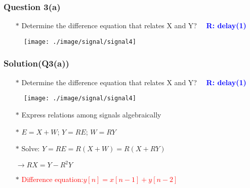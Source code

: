 \documentclass{beamer}
\newcommand{\blue}[1]{\textcolor{blue}{#1}}
\newcommand{\red}[1]{\textcolor{red}{#1}}
\begin{document}

\begin{frame}
\frametitle{Question 3(a)}

\begin{itemize} \itemsep1pt \parskip0pt 
  \item[$\ast$] Determine the difference equation that relates X and Y?  ~~\blue{\bf R: delay(1)}
\end{itemize}
\vspace{20 mm}


\begin{figure}[H]
  \centering
  \texttt{[image: ./image/signal/signal4]}
\end{figure}
\vspace{10 mm}

\end{frame}


\begin{frame}
\frametitle{Solution(Q3(a))}

\begin{itemize} \itemsep1pt \parskip0pt 
  \item[$\ast$] Determine the difference equation that relates X and Y?  ~~\blue{\bf R: delay(1)}
\end{itemize}


\begin{figure}[H]
  \centering
  \texttt{[image: ./image/signal/signal4]}
\end{figure}


\begin{itemize} \itemsep1pt \parskip0pt 
  \item[$\ast$] Express relations among signals algebraically
  \item[$\ast$] $E = X + W$; $Y = RE$; $W = RY$
  \item[$\ast$] Solve: $Y = RE = R(X + W) = R(X + RY)$
  \item[] $\rightarrow RX = Y-R^2Y$
  \item[$\ast$] \red{Difference equation:$y[n] = x[n-1] + y[n-2]$}
\end{itemize}

\end{frame}

\end{document}
